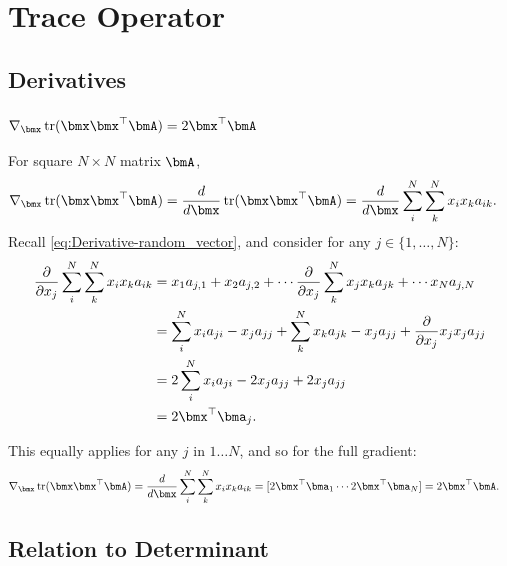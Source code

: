 \documentclass[11pt]{article}
\DeclareMathOperator{\Trace}{tr}
\begin{document}
\section{Trace Operator}
\subsection{Derivatives}
\subsubsection{$\nabla_{\bmx}\Trace(\bmx \bmx^\top \bmA) = 2\bmx^\top \bmA$}
For square $N\times N$ matrix $\bmA$,
\begin{align*}
\nabla_{\bmx}\Trace(\bmx \bmx^\top \bmA) =
\frac{d}{d \bmx}\Trace(\bmx \bmx^\top \bmA) &=
\frac{d}{d \bmx} \sum_{i}^{N} \sum_{k}^{N} x_i x_k a_{ik}.
\end{align*}
Recall \cref{eq:Derivative-random_vector}, and consider for any $j \in \{1,\ldots, N\}$:
\begin{align*}
\frac{\partial}{\partial x_j} \sum_{i}^{N} \sum_{k}^{N} x_i x_k a_{ik} &=
x_1a_{j,1} + x_2a_{j,2} + \cdots \frac{\partial}{\partial x_j} \sum_{k}^{N} x_j x_k a_{jk} + \cdots x_N a_{j, N} \\
&= \sum_i^N x_ia_{ji} - x_ja_{jj} + \sum_{k}^{N} x_k a_{jk} - x_ja_{jj} + \frac{\partial}{\partial x_j} x_j x_j a_{jj} \\
&= 2\sum_i^N x_ia_{ji} - 2 x_ja_{jj} + 2 x_ja_{jj} \\
&= 2\bmx^\top \bma_j.
\end{align*}

This equally applies for any $j$ in $1\ldots N$, and so for the full gradient:
\begin{align}
\nabla_{\bmx}\Trace(\bmx \bmx^\top \bmA) =
\frac{d}{d \bmx} \sum_{i}^{N} \sum_{k}^{N} x_i x_k a_{ik} &=
[2 \bmx^\top \bma_1 \cdots 2\bmx^\top \bma_N] = 2\bmx^\top \bmA.
\label{eq:Trace-Derivative-tr(xx'A)}
\end{align}

\subsection{Relation to Determinant}
\end{document}
